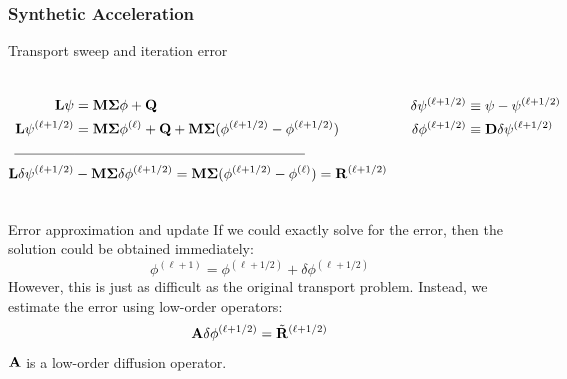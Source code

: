 \documentclass[compress,10pt]{beamer}
\begin{document}
\begin{frame}[t]\frametitle{Synthetic Acceleration}

\begin{block}{Transport sweep and iteration error}{\small
\begin{columns}

\begin{equation*}
\begin{aligned}
{\bf L} \psi              &= {\bf M\Sigma} \phi          +{\bf Q} \\
{\bf L} \psi^{(\ell+1/2)} &= {\bf M\Sigma} \phi^{(\ell)} +{\bf Q} + {\bf M\Sigma} (\phi^{(\ell+1/2)}-\phi^{(\ell+1/2)})\\
\noindent\rule{1.5cm}{0.4pt} &\noindent\rule{5.8cm}{0.4pt} \\
{\bf L} \delta \psi^{(\ell+1/2)} &- {\bf M\Sigma} \delta \phi^{(\ell+1/2)} = {\bf M\Sigma} (\phi^{(\ell+1/2)}-\phi^{(\ell)}) = {\bf R}^{(\ell+1/2)}
\end{aligned}
\end{equation*}

\begin{equation*}
\begin{aligned}
\delta \psi^{(\ell+1/2)} &\equiv \psi - \psi^{(\ell+1/2)} \\
\delta \phi^{(\ell+1/2)} &\equiv {\bf D} \delta \psi^{(\ell+1/2)}
\end{aligned}
\end{equation*}
\end{columns}
}
\end{block}

\begin{block}{Error approximation and update}{\small
If we could exactly solve for the error, then the solution could be obtained immediately:
\begin{equation*}
\phi^{(\ell+1)} = \phi^{(\ell+1/2)} + \delta \phi^{(\ell+1/2)}
\end{equation*}
However, this is just as difficult as the original transport problem. Instead, we estimate the error using low-order operators:
\begin{equation*}
{\bf A} \delta \phi^{(\ell+1/2)} = \tilde{{\bf R}}^{(\ell+1/2)}
\end{equation*}
${\bf A}$ is a low-order diffusion operator.
}
\end{block}

\end{frame}
%
\end{document}
